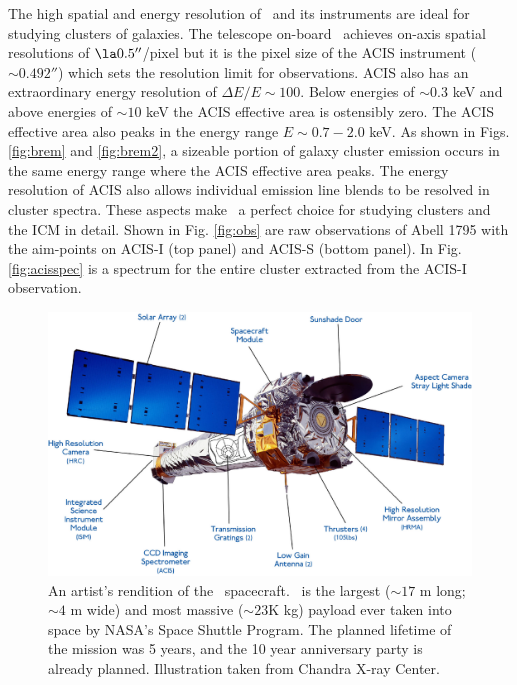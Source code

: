 The high spatial and energy resolution of \chandra\ and its
instruments are ideal for studying clusters of galaxies. The telescope
on-board \chandra\ achieves on-axis spatial resolutions of $\la
0.5''$/pixel but it is the pixel size of the ACIS instrument ($\sim
0.492''$) which sets the resolution limit for observations. ACIS also
has an extraordinary energy resolution of $\Delta E/E \sim 100$. Below
energies of $\sim 0.3$ keV and above energies of $\sim 10$ keV the
ACIS effective area is ostensibly zero. The ACIS effective area also
peaks in the energy range $E \sim 0.7-2.0$ keV. As shown in
Figs. \ref{fig:brem} and \ref{fig:brem2}, a sizeable portion of galaxy
cluster emission occurs in the same energy range where the ACIS
effective area peaks. The energy resolution of ACIS also allows
individual emission line blends to be resolved in cluster
spectra. These aspects make \chandra\ a perfect choice for studying
clusters and the ICM in detail. Shown in Fig. \ref{fig:obs} are raw
observations of Abell 1795 with the aim-points on ACIS-I (top panel)
and ACIS-S (bottom panel). In Fig. \ref{fig:acisspec} is a spectrum
for the entire cluster extracted from the ACIS-I observation.

\begin{figure}[!hb]
  \begin{center}
    \includegraphics*[width=\textwidth, trim=0mm 0mm 0mm 0mm, clip]{chandra}
    \caption[\chandra\ X-ray Observatory spacecraft.]{An artist's
      rendition of the \chandra\ spacecraft. \chandra\ is the largest
      ($\sim 17$ m long; $\sim 4$ m wide) and most massive ($\sim 23$K
      kg) payload ever taken into space by NASA's Space Shuttle
      Program. The planned lifetime of the mission was 5 years, and
      the 10 year anniversary party is already planned. Illustration
      taken from Chandra X-ray Center.}
    \label{fig:chandra}
  \end{center}
\end{figure}

